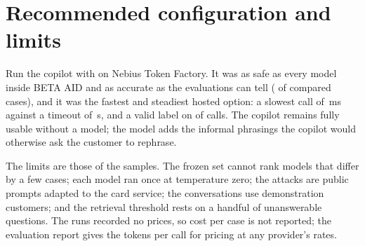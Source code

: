 \section{Recommended configuration and limits}

Run the copilot with  on Nebius Token Factory. It was as safe as every model inside
BETA AID and as accurate as the evaluations can tell ( of
 compared cases), and it was the fastest and steadiest hosted option: a
slowest call of \,ms against a timeout of \,s, and a valid
label on  of  calls. The copilot remains fully usable
without a model; the model adds the informal phrasings the copilot would otherwise ask the customer to rephrase.

The limits are those of the samples. The frozen set cannot rank models that differ by a few cases; each model ran once
at temperature zero; the attacks are public prompts adapted to the card service; the conversations use demonstration
customers; and the retrieval threshold rests on a handful of unanswerable questions. The runs recorded no prices, so
cost per case is not reported; the evaluation report gives the tokens per call for pricing at any provider's rates.
